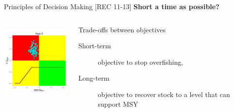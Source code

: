 \documentclass{beamer}
\newcommand\Fontviii{\fontsize{8}{10}\selectfont}
\begin{document}
\begin{frame}{Principles of Decision Making [REC 11-13]}
   \smallskip\textbf{Short a time as possible?}\smallskip\\
  \begin{columns}[t] %
   \begin{column}[T]{5cm} %
    \includegraphics[height=40mm]{hcrI1.png}
   \end{column}
   \begin{column}[T]{6cm} %
   \smallskip Trade-offs between objectives\smallskip\\
   \Fontviii
   \begin{description}%
       \item[Short-term] objective to stop overfishing,
       \item[Long-term] objective to recover stock to a level that can support MSY
     \end{description}
   \end{column}
\end{columns}
\end{frame}

\end{document}
